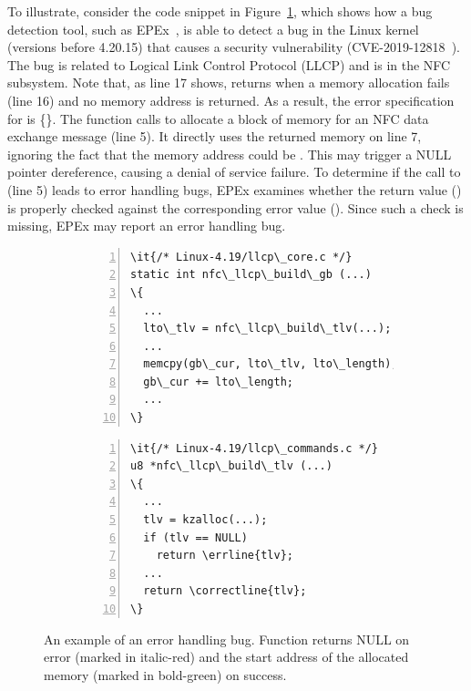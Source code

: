 \documentclass[12pt]{report}	%
\begin{document}
To illustrate, consider the code snippet in Figure~\ref{fig:errhandlingbug},
which shows how a bug detection tool, such as  EPEx~\cite{jana2016automatically},
is able to detect a bug
in the Linux kernel (versions before 4.20.15) 
that causes a security vulnerability (CVE-2019-12818~\cite{CVE:2019:12818}).
%
The bug is related to 
Logical Link Control Protocol (LLCP) and is in the NFC subsystem.
%
Note that, as line 17 shows,  returns  when a memory allocation fails (line 16) 
and no memory address is returned.
As a result, the error specification for  is
\{\}. 
%
The function  
calls 
to allocate a block of memory for an NFC data exchange message (line 5).
%
It directly uses the returned memory on line 7, ignoring the
fact that the memory address could be .
This may 
trigger a NULL pointer dereference,
causing a denial of service failure.
%
To determine if the call 
to  (line 5)
leads to error handling bugs,
EPEx examines whether the return value ()
is properly checked against the corresponding error value ().
%
%
Since such a check is missing, 
EPEx may report an error handling bug. 

\begin{figure}[t]
\centering
\begin{subfigure}[b]{0.5\textwidth}
\begin{Verbatim}[numbers=left,xleftmargin=6mm,fontsize=\footnotesize,
    commandchars=\\\{\}]
\it{/* Linux-4.19/llcp\_core.c */}
static int nfc\_llcp\_build\_gb (...)
\{
  ...
  lto\_tlv = nfc\_llcp\_build\_tlv(...);
  ...
  memcpy(gb\_cur, lto\_tlv, lto\_length);
  gb\_cur += lto\_length;
  ...
\}
\end{Verbatim}
\end{subfigure}%
\hfill
\begin{subfigure}[b]{0.5\textwidth}
\begin{Verbatim}[numbers=left,xleftmargin=6mm,fontsize=\footnotesize,
    commandchars=\\\{\},firstnumber=last]
\it{/* Linux-4.19/llcp\_commands.c */}
u8 *nfc\_llcp\_build\_tlv (...)
\{
  ...
  tlv = kzalloc(...);
  if (tlv == NULL)
    return \errline{tlv};
  ...
  return \correctline{tlv};
\}
\end{Verbatim}
\end{subfigure}
\caption[An example of an error handling bug]{An example of an error handling bug.
Function  returns NULL on error (marked in italic-red)
and the start address of the allocated memory (marked in bold-green) on success.}
\label{fig:errhandlingbug}
\end{figure}
\end{document}
